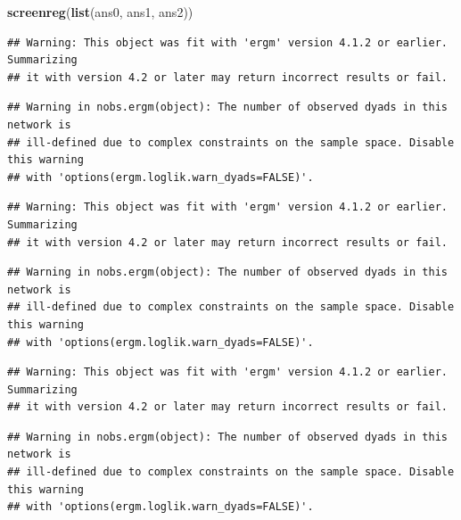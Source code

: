 \documentclass[
]{book}
\newenvironment{Shaded}{\begin{snugshade}}{\end{snugshade}}
\newcommand{\FunctionTok}[1]{\textcolor[rgb]{0.13,0.29,0.53}{\textbf{#1}}}
\newcommand{\NormalTok}[1]{#1}
\begin{document}
\begin{Shaded}
\begin{Highlighting}[]
\FunctionTok{screenreg}\NormalTok{(}\FunctionTok{list}\NormalTok{(ans0, ans1, ans2))}
\end{Highlighting}
\end{Shaded}

\begin{verbatim}
## Warning: This object was fit with 'ergm' version 4.1.2 or earlier. Summarizing
## it with version 4.2 or later may return incorrect results or fail.
\end{verbatim}

\begin{verbatim}
## Warning in nobs.ergm(object): The number of observed dyads in this network is
## ill-defined due to complex constraints on the sample space. Disable this warning
## with 'options(ergm.loglik.warn_dyads=FALSE)'.
\end{verbatim}

\begin{verbatim}
## Warning: This object was fit with 'ergm' version 4.1.2 or earlier. Summarizing
## it with version 4.2 or later may return incorrect results or fail.
\end{verbatim}

\begin{verbatim}
## Warning in nobs.ergm(object): The number of observed dyads in this network is
## ill-defined due to complex constraints on the sample space. Disable this warning
## with 'options(ergm.loglik.warn_dyads=FALSE)'.
\end{verbatim}

\begin{verbatim}
## Warning: This object was fit with 'ergm' version 4.1.2 or earlier. Summarizing
## it with version 4.2 or later may return incorrect results or fail.
\end{verbatim}

\begin{verbatim}
## Warning in nobs.ergm(object): The number of observed dyads in this network is
## ill-defined due to complex constraints on the sample space. Disable this warning
## with 'options(ergm.loglik.warn_dyads=FALSE)'.
\end{verbatim}
\end{document}
